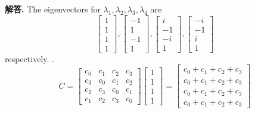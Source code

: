 \documentclass[12pt, a4paper, oneside]{article}
\newenvironment{solution}{\par\noindent\textbf{解答. }}{\par}
\begin{document}
\begin{CJK}{UTF8}{gbsn}
\begin{solution}
  The eigenvectors for $\lambda_1,\lambda_2,\lambda_3,\lambda_4$ are
  $$ 
    \begin{bmatrix}
      1 \\ 1 \\ 1 \\ 1
    \end{bmatrix}, 
    \begin{bmatrix}
      -1 \\ 1 \\ -1 \\ 1 
    \end{bmatrix},
    \begin{bmatrix}
      i \\ -1 \\ -i \\ 1
    \end{bmatrix},
    \begin{bmatrix}
      -i \\ -1 \\ i \\ 1
    \end{bmatrix}
  $$
  respectively. . 
  $$ 
    C = \begin{bmatrix}
      c_0 & c_1 & c_2 & c_3 \\
      c_3 & c_0 & c_1 & c_2 \\ 
      c_2 & c_3 & c_0 & c_1 \\ 
      c_1 & c_2 & c_3 & c_0
    \end{bmatrix} \begin{bmatrix}
      1 \\ 1 \\ 1 \\ 1 
    \end{bmatrix} = 
    \begin{bmatrix}
      c_0 + c_1 + c_2 + c_3 \\
      c_0 + c_1 + c_2 + c_3 \\
      c_0 + c_1 + c_2 + c_3 \\
      c_0 + c_1 + c_2 + c_3 
    \end{bmatrix}
  $$ 


\end{solution}
\end{CJK}
\end{document}

